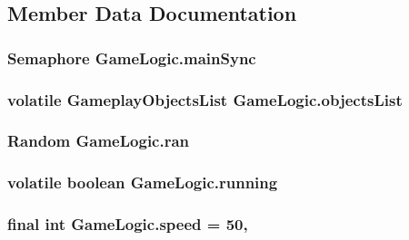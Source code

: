\subsection{Member Data Documentation}
\hypertarget{classGameLogic_a09c53c7f1a59ad90cd34966360edddcc}{
\subsubsection[{main\-Sync}]{\setlength{\rightskip}{0pt plus 5cm}Semaphore Game\-Logic.\-main\-Sync\hspace{0.3cm}{\ttfamily [private]}}}\label{classGameLogic_a09c53c7f1a59ad90cd34966360edddcc}
\hypertarget{classGameLogic_a48be08c7f3371c4e6fc68aaf6c839afe}{
\subsubsection[{objects\-List}]{\setlength{\rightskip}{0pt plus 5cm}volatile {\bf Gameplay\-Objects\-List} Game\-Logic.\-objects\-List\hspace{0.3cm}{\ttfamily [private]}}}\label{classGameLogic_a48be08c7f3371c4e6fc68aaf6c839afe}
\hypertarget{classGameLogic_a1b940a2b65f42fdee9ee1fb7a910b1d2}{
\subsubsection[{ran}]{\setlength{\rightskip}{0pt plus 5cm}Random Game\-Logic.\-ran\hspace{0.3cm}{\ttfamily [private]}}}\label{classGameLogic_a1b940a2b65f42fdee9ee1fb7a910b1d2}
\hypertarget{classGameLogic_af6686d787ae2639adc84f522f332c3ee}{
\subsubsection[{running}]{\setlength{\rightskip}{0pt plus 5cm}volatile boolean Game\-Logic.\-running\hspace{0.3cm}{\ttfamily [private]}}}\label{classGameLogic_af6686d787ae2639adc84f522f332c3ee}
\hypertarget{classGameLogic_ad140b2df5a64378f6039ba1f683f6b9f}{
\subsubsection[{speed}]{\setlength{\rightskip}{0pt plus 5cm}final int Game\-Logic.\-speed = 50\hspace{0.3cm}{\ttfamily [static]}, {\ttfamily [private]}}}\label{classGameLogic_ad140b2df5a64378f6039ba1f683f6b9f}
